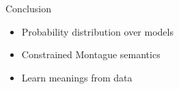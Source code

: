 \documentclass{beamer}
\newlength{\wideitemsep}
\let\olditem\item
\renewcommand{\item}{\setlength{\itemsep}{\wideitemsep}\olditem}
\begin{document}
\begin{frame}{Conclusion}
  \begin{itemize}
  \item Probability distribution over models
  \item Constrained Montague semantics
  \item Learn meanings from data
  \end{itemize}
\end{frame}


\end{document}
